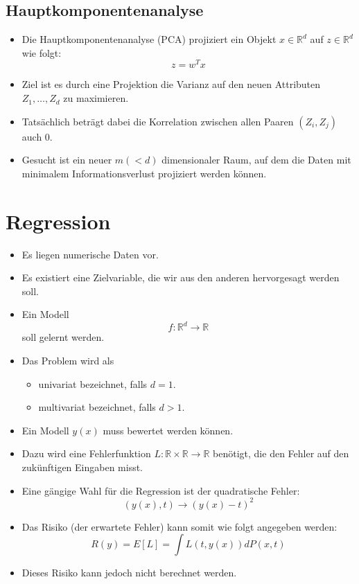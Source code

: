 \documentclass{scrartcl}
\begin{document}
\subsection{Hauptkomponentenanalyse}

\begin{itemize}
	\item Die Hauptkomponentenanalyse (PCA) projiziert ein Objekt $ x \in 
	\mathbb{R}^d $ auf $ z \in \mathbb{R}^d $ wie folgt:
	\[ z=w^Tx \]
	\item Ziel ist es durch eine Projektion die Varianz auf den neuen 
	Attributen $ Z_1,\ldots,Z_d $ zu maximieren.
	\item Tatsächlich beträgt dabei die Korrelation zwischen allen Paaren $ 
	(Z_i,Z_j) $ auch 0.
	\item Gesucht ist ein neuer $ m (<d) $ dimensionaler Raum, auf dem die 
	Daten mit minimalem Informationsverlust projiziert werden können.
\end{itemize}

\section{Regression}

\begin{itemize}
	\item Es liegen numerische Daten vor.
	\item Es existiert eine Zielvariable, die wir aus den anderen hervorgesagt 
	werden soll.
	\item Ein Modell
	\[ f: \mathbb{R}^d \rightarrow \mathbb{R} \]
	soll gelernt werden.
	\item Das Problem wird als
	\begin{itemize}
		\item univariat bezeichnet, falls $ d=1 $.
		\item multivariat bezeichnet, falls $ d>1 $.
	\end{itemize}
	\item Ein Modell $ y(x) $ muss bewertet werden können.
	\item Dazu wird eine Fehlerfunktion $ L: \mathbb{R} \times \mathbb{R} 
	\rightarrow \mathbb{R} $ benötigt, die den Fehler auf den zukünftigen 
	Eingaben misst.
	\item Eine gängige Wahl für die Regression ist der quadratische Fehler:
	\[ (y(x), t) \rightarrow (y(x) - t)^2 \]
	\item Das Risiko (der erwartete Fehler) kann somit wie folgt angegeben 
	werden:
	\[ R(y) = E[L] = \int L(t, y(x)) dP(x,t) \]
	\item Dieses Risiko kann jedoch nicht berechnet werden.
\end{itemize}
\end{document}
